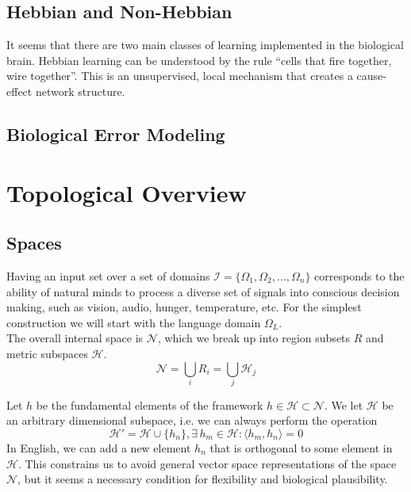 \documentclass[twocolumn, 10pt]{article}
\begin{document}
\subsection{Hebbian and Non-Hebbian}
It seems that there are two main classes of learning implemented in the biological brain. Hebbian learning can be understood by the rule ``cells that fire together, wire together''. This is an unsupervised, local mechanism that creates a cause-effect network structure.

\subsection{Biological Error Modeling}


\section{Topological Overview}
\subsection{Spaces}
Having an input set over a set of domains $\mathcal{I} =\{ \Omega_1, \Omega_2,..., \Omega_n \}$ corresponds to the ability of natural minds to process a diverse set of signals into conscious decision making, such as vision, audio, hunger, temperature, etc. For the simplest construction we will start with the language domain $\Omega_L$. \\ 

The overall internal space is $\mathcal{N}$, which we break up into region subsets $R$ and metric subspaces $\mathcal{H}$.
\begin{equation}
    \mathcal{N} = \bigcup_i R_i = \bigcup_j \mathcal{H}_j   
\end{equation} 

Let $h$ be the fundamental elements of the framework $h \in \mathcal{H} \subset \mathcal{N}$. We let $\mathcal{H}$ be an arbitrary dimensional subspace, i.e. we can always perform the operation 
\begin{equation}
    \mathcal{H}' = \mathcal{H} \cup \{h_n \} , \exists  \, h_m \in \mathcal{H}: \langle h_m, h_n\rangle = 0
\end{equation}
In English, we can add a new element $h_n$ that is orthogonal to some element in $\mathcal{H}$. This constrains us to avoid general vector space representations of the space $\mathcal{N}$, but it seems a necessary condition for flexibility and biological plausibility. \\
\end{document}
